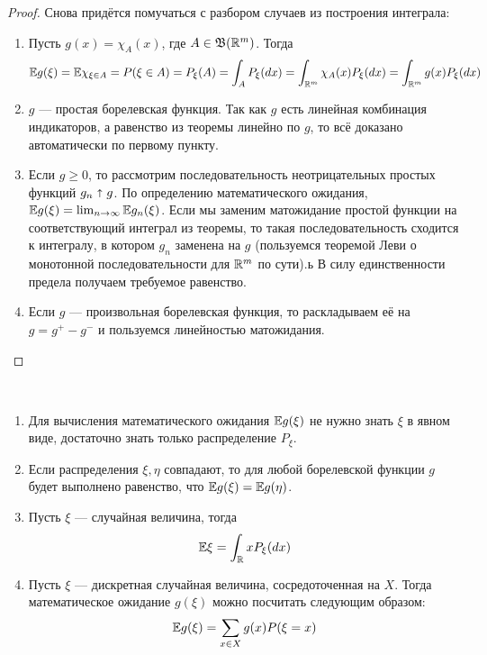 \begin{proof}
	Снова придётся помучаться с разбором случаев из построения интеграла:
	\begin{enumerate}
		\item Пусть $g(x) = \chi_A(x)$, где $A \in \mathfrak{B}(\mathbb{R}^m)$. Тогда
		\[
			\mathbb{E} g(\xi) = \mathbb{E} \chi_{\xi \in A} = P(\xi \in A) = P_\xi(A) = \int_A P_\xi(dx) = \int_{\mathbb{R}^m} \chi_A(x)P_\xi(dx) = \int_{\mathbb{R}^m} g(x)P_\xi(dx)
		\]
		
		\item $g$ --- простая борелевская функция. Так как $g$ есть линейная комбинация индикаторов, а равенство из теоремы линейно по $g$, то всё доказано автоматически по первому пункту.
		
		\item Если $g \ge 0$, то рассмотрим последовательность неотрицательных простых функций $g_n \shortuparrow g$. По определению математического ожидания, $\mathbb{E} g(\xi) = \lim_{n \to \infty} \mathbb{E} g_n(\xi)$. Если мы заменим матожидание простой функции на соответствующий интеграл из теоремы, то такая последовательность сходится к интегралу, в котором $g_n$ заменена на $g$ (пользуемся теоремой Леви о монотонной последовательности для $\mathbb{R}^m$ по сути).ь В силу единственности предела получаем требуемое равенство.
		
		\item Если $g$ --- произвольная борелевская функция, то раскладываем её на $g = g^+ - g^-$ и пользуемся линейностью матожидания.
	\end{enumerate}
\end{proof}

\begin{corollary}~
	\begin{enumerate}
		\item Для вычисления математического ожидания $\mathbb{E} g(\xi)$ не нужно знать $\xi$ в явном виде, достаточно знать только распределение $P_\xi$.
		
		\item Если распределения $\xi, \eta$ совпадают, то для любой борелевской функции $g$ будет выполнено равенство, что $\mathbb{E} g(\xi) = \mathbb{E} g(\eta)$.
		
		\item Пусть $\xi$ --- случайная величина, тогда
		\[
			\mathbb{E}\xi = \int_{\mathbb{R}} xP_\xi(dx)
		\]
		
		\item Пусть $\xi$ --- дискретная случайная величина, сосредоточенная на $X$. Тогда математическое ожидание $g(\xi)$ можно посчитать следующим образом:
		\[
			\mathbb{E} g(\xi) = \sum_{x \in X} g(x)P(\xi = x)
		\]
	\end{enumerate}
\end{corollary}

